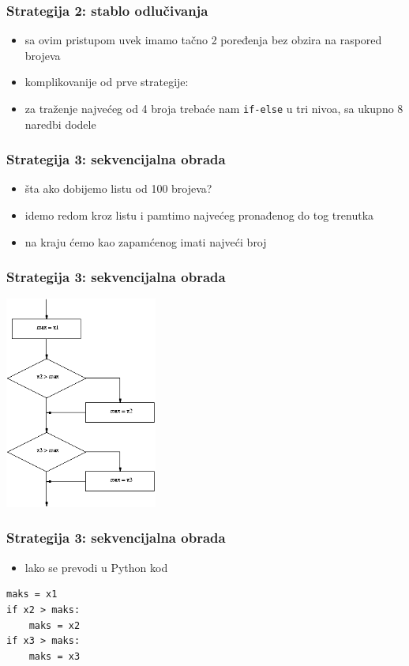\documentclass[utf8,compress,aspectratio=169]{beamer}
\begin{document}
\begin{frame}[fragile]
  \frametitle{Strategija 2: stablo odlučivanja}
  \begin{itemize}
    \item sa ovim pristupom uvek imamo tačno 2 poređenja bez obzira na raspored brojeva
    \item komplikovanije od prve strategije:
    \item za traženje najvećeg od 4 broja trebaće nam \texttt{if-else} u tri nivoa, sa ukupno 8 naredbi dodele
  \end{itemize}
\end{frame}

\begin{frame}[fragile]
  \frametitle{Strategija 3: sekvencijalna obrada}
  \begin{itemize}
    \item šta ako dobijemo listu od 100 brojeva?
    \item idemo redom kroz listu i pamtimo najvećeg pronađenog do tog trenutka
    \item na kraju ćemo kao zapamćenog imati najveći broj
  \end{itemize}
\end{frame}

\begin{frame}[fragile]
  \frametitle{Strategija 3: sekvencijalna obrada}
\begin{center}
  \includegraphics[width=5cm]{pic18}
\end{center}
\end{frame}

\begin{frame}[fragile]
  \frametitle{Strategija 3: sekvencijalna obrada}
  \begin{itemize}
    \item lako se prevodi u Python kod
  \end{itemize}
\begin{verbatim}
maks = x1
if x2 > maks:
    maks = x2
if x3 > maks:
    maks = x3
\end{verbatim}
\end{frame}
\end{document}
